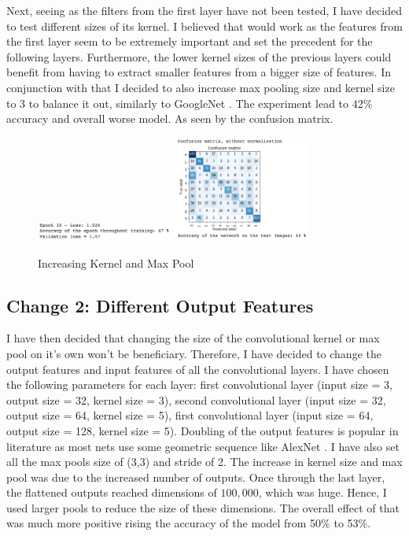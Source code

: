 \documentclass{article}
\begin{document}
    Next, seeing as the filters from the first layer have not been tested, I have decided to test different sizes of its kernel. I believed that would work as the features from the first layer seem to be extremely important and set the precedent for the following layers. Furthermore, the lower kernel sizes of the previous layers could benefit from having to extract smaller features from a bigger size of features. In conjunction with that I decided to also increase max pooling size and kernel size to 3 to balance it out, similarly to GoogleNet \cite{googlenet}. The experiment lead to 42\% accuracy and overall worse model. As seen by the confusion matrix.\\

    \begin{figure}[h!]
        \centering
        \includegraphics[width=0.4\textwidth]{7ks_3mp_train}
        \includegraphics[width=0.4\textwidth]{7ks_3mp}
        \caption{Increasing Kernel and Max Pool}
    \end{figure}
    
    \newpage

    \subsection{Change 2: Different Output Features}

    I have then decided that changing the size of the convolutional kernel or max pool on it's own won't be beneficiary. Therefore, I have decided to change the output features and input features of all the convolutional layers. I have chosen the following parameters for each layer: first convolutional layer (input size = 3, output size = 32, kernel size = 3), second convolutional layer (input size = 32, output size = 64, kernel size = 5), first convolutional layer (input size = 64, output size = 128, kernel size = 5). Doubling of the output features is popular in literature as most nets use some geometric sequence like AlexNet \cite{alexnet}. I have also set all the max pools size of (3,3) and stride of 2. The increase in kernel size and max pool was due to the increased number of outputs. Once through the last layer, the flattened outputs reached dimensions of $100,000$, which was huge. Hence, I used larger pools to reduce the size of these dimensions. The overall effect of that was much more positive rising the accuracy of the model from 50\% to 53\%.
\end{document}
